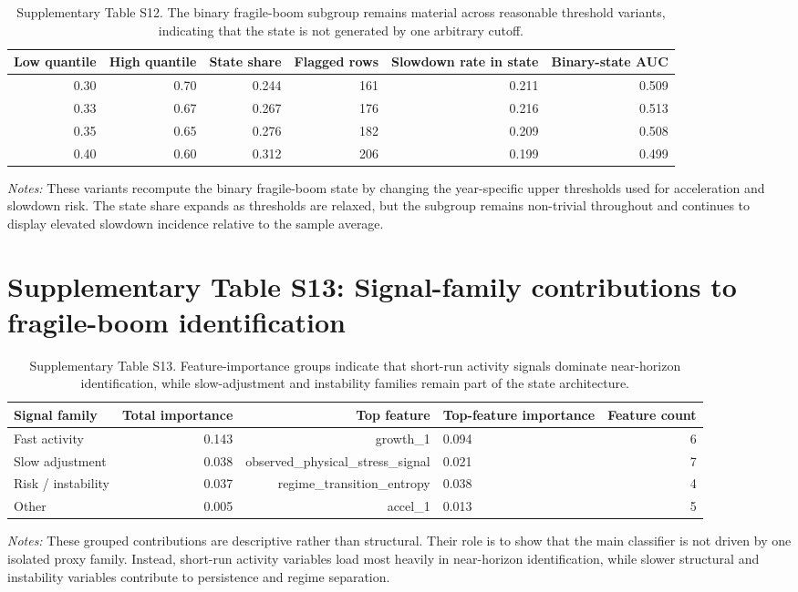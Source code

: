 \documentclass[oneside,pdflatex,sn-nature]{sn-jnl}
\begin{document}
\begin{table}[H]
\centering
\caption{Supplementary Table S12. The binary fragile-boom subgroup remains material across reasonable threshold variants, indicating that the state is not generated by one arbitrary cutoff.}
\small
\setlength{\tabcolsep}{4pt}
\begin{tabular}{rrrrrr}
\toprule
Low quantile & High quantile & State share & Flagged rows & Slowdown rate in state & Binary-state AUC \\
\midrule
0.30 & 0.70 & 0.244 & 161 & 0.211 & 0.509 \\
0.33 & 0.67 & 0.267 & 176 & 0.216 & 0.513 \\
0.35 & 0.65 & 0.276 & 182 & 0.209 & 0.508 \\
0.40 & 0.60 & 0.312 & 206 & 0.199 & 0.499 \\
\bottomrule
\end{tabular}
\end{table}
\FloatBarrier

\noindent\textit{Notes:} These variants recompute the binary fragile-boom state by changing the year-specific upper thresholds used for acceleration and slowdown risk. The state share expands as thresholds are relaxed, but the subgroup remains non-trivial throughout and continues to display elevated slowdown incidence relative to the sample average.

\section{Supplementary Table S13: Signal-family contributions to fragile-boom identification}

\begin{table}[H]
\centering
\caption{Supplementary Table S13. Feature-importance groups indicate that short-run activity signals dominate near-horizon identification, while slow-adjustment and instability families remain part of the state architecture.}
\small
\setlength{\tabcolsep}{4pt}
\begin{tabular}{p{}rrp{}r}
\toprule
Signal family & Total importance & Top feature & Top-feature importance & Feature count \\
\midrule
Fast activity & 0.143 & growth\_1 & 0.094 & 6 \\
Slow adjustment & 0.038 & observed\_physical\_stress\_signal & 0.021 & 7 \\
Risk / instability & 0.037 & regime\_transition\_entropy & 0.038 & 4 \\
Other & 0.005 & accel\_1 & 0.013 & 5 \\
\bottomrule
\end{tabular}
\end{table}
\FloatBarrier

\noindent\textit{Notes:} These grouped contributions are descriptive rather than structural. Their role is to show that the main classifier is not driven by one isolated proxy family. Instead, short-run activity variables load most heavily in near-horizon identification, while slower structural and instability variables contribute to persistence and regime separation.
\end{document}
